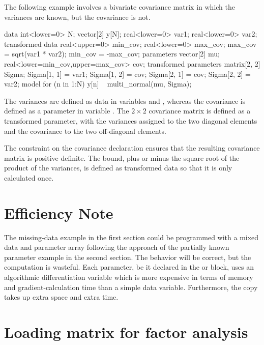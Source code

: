 The following example involves a bivariate covariance matrix in which the
variances are known, but the covariance is not.
%
\begin{stancode}
data {
  int<lower=0> N;
  vector[2] y[N];
  real<lower=0> var1;     real<lower=0> var2;
}
transformed data {
  real<upper=0> min_cov;   
  real<lower=0> max_cov;  
  max_cov = sqrt(var1 * var2);  
  min_cov = -max_cov;
}
parameters {
  vector[2] mu;
  real<lower=min_cov,upper=max_cov> cov;
}
transformed parameters {
  matrix[2, 2] Sigma;
  Sigma[1, 1] = var1;     Sigma[1, 2] = cov;
  Sigma[2, 1] = cov;      Sigma[2, 2] = var2;
}  
model {
 for (n in 1:N)
   y[n] ~ multi_normal(mu, Sigma);
}
\end{stancode}
%
The variances are defined as data in variables  and
, whereas the covariance is defined as a parameter in
variable .  The $2 \times 2$ covariance matrix
 is defined as a transformed parameter, with the variances
assigned to the two diagonal elements and the covariance to the two
off-diagonal elements.

The constraint on the covariance declaration ensures that the
resulting covariance matrix  is positive definite.  The
bound, plus or minus the square root of the product of the variances,
is defined as transformed data so that it is only calculated once.

\section{Efficiency Note}

The missing-data example in the first section could be programmed with
a mixed data and parameter array following the approach of the
partially known parameter example in the second section.  The behavior
will be correct, but the computation is wasteful.  Each parameter, be
it declared in the  or 
block, uses an algorithmic differentiation variable which is more
expensive in terms of memory and gradient-calculation time than a
simple data variable.  Furthermore, the copy takes up extra space and
extra time.

\section{Loading matrix for factor analysis}

